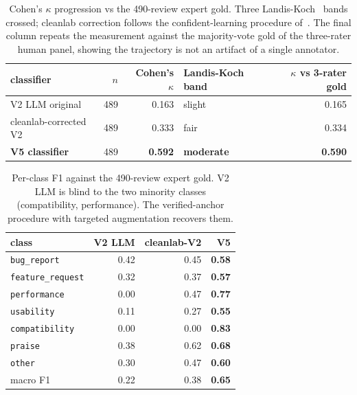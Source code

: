 \documentclass[sigconf, anonymous]{acmart}
\begin{document}
\begin{table}[t]\centering\footnotesize
  \caption{Cohen's $\kappa$ progression vs the 490-review expert gold. Three
  Landis-Koch~\cite{landis1977measurement} bands crossed; cleanlab correction follows the
  confident-learning procedure of~\cite{northcutt2021confident}. The final column repeats the
  measurement against the majority-vote gold of the three-rater human panel, showing the
  trajectory is not an artifact of a single annotator.}\label{tab:kappa}
  \begin{tabular}{lrrlr}\toprule
  classifier & $n$ & Cohen's $\kappa$ & Landis-Koch band & $\kappa$ vs 3-rater gold \\\midrule
  V2 LLM original & 489 & 0.163 & slight & 0.165 \\
  cleanlab-corrected V2 & 489 & 0.333 & fair & 0.334 \\
  \textbf{V5 classifier} & 489 & \textbf{0.592} & \textbf{moderate} & \textbf{0.590} \\
  \bottomrule\end{tabular}\end{table}

\begin{table}[t]\centering\footnotesize
  \caption{Per-class F1 against the 490-review expert gold. V2 LLM is blind to the two minority
  classes (compatibility, performance). The verified-anchor procedure with targeted augmentation
  recovers them.}\label{tab:perclass-f1}
  \begin{tabular}{lrrr}\toprule
  class & V2 LLM & cleanlab-V2 & \textbf{V5} \\\midrule
  \texttt{bug\_report} & 0.42 & 0.45 & \textbf{0.58} \\
  \texttt{feature\_request} & 0.32 & 0.37 & \textbf{0.57} \\
  \texttt{performance} & 0.00 & 0.47 & \textbf{0.77} \\
  \texttt{usability} & 0.11 & 0.27 & \textbf{0.55} \\
  \texttt{compatibility} & 0.00 & 0.00 & \textbf{0.83} \\
  \texttt{praise} & 0.38 & 0.62 & \textbf{0.68} \\
  \texttt{other} & 0.30 & 0.47 & \textbf{0.60} \\\midrule
  macro F1 & 0.22 & 0.38 & \textbf{0.65} \\
  \bottomrule\end{tabular}\end{table}
\end{document}
